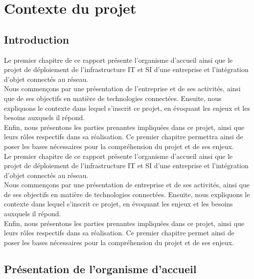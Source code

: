 \chapter{Contexte du projet}


\section{Introduction}
Le premier chapitre de ce rapport présente l'organisme d'accueil ainsi que le projet de déploiement de l'infrastructure IT et SI d'une entreprise et l'intégration d'objet connectés au réseau. \\

Nous commençons  par une présentation de l'entreprise et de ses activités, ainsi que de ses objectifs en matière de technologies connectées. Ensuite, nous expliquons le contexte dans lequel s'inscrit ce projet, en évoquant les enjeux et les besoins auxquels il répond.\\

Enfin, nous présentons  les parties prenantes impliquées dans ce projet, ainsi que leurs rôles respectifs dans sa réalisation. Ce premier chapitre permettra ainsi de poser les bases nécessaires pour la compréhension du projet et de ses enjeux.\\



Le premier chapitre de ce rapport présente l'organisme d'accueil ainsi que le projet de déploiement de l'infrastructure IT et SI d'une entreprise et l'intégration d'objet connectés au réseau. \\

 Nous commençons par une présentation de entreprise et de ses activités, ainsi que de ses objectifs en matière de technologies connectées. Ensuite, nous expliquons le contexte dans lequel s'inscrit ce projet, en évoquant les enjeux et les besoins auxquels il répond.\\
 
Enfin, nous présentons les parties prenantes impliquées dans ce projet, ainsi que leurs rôles respectifs dans sa réalisation. Ce premier chapitre permet ainsi de poser les bases nécessaires pour la compréhension du projet et de ses enjeux. \\


\section{Présentation de l'organisme d'accueil }

